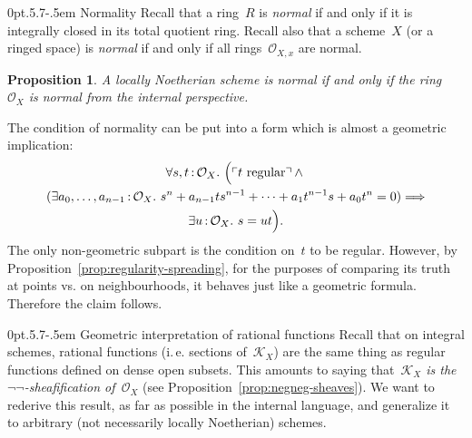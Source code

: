 \documentclass[10pt,reqno,a4paper]{amsbook}
\makeatletter
\theoremstyle{definition}
\theoremstyle{plain}
\newtheorem{prop}[defn]{Proposition}
\theoremstyle{remark}
\renewcommand{\O}{\mathcal{O}}
\newcommand{\K}{\mathcal{K}}
\newcommand{\?}{\,{:}\,}
\renewcommand{\_}{\mathpunct{.}\,}
\newcommand{\speak}[1]{\ulcorner\text{\textnormal{#1}}\urcorner}
\newcommand{\ie}{i.\,e.\@\xspace}
\newcommand{\vs}{vs.\@\xspace}
\renewenvironment{proof}[1][\proofname]{\par
  \pushQED{\qed}%
  \normalfont \topsep6\p@\@plus6\p@\relax
  \trivlist
  \item[\hskip\labelsep
        \itshape
    #1\@addpunct{.}]\ignorespaces
}{%
  \popQED\endtrivlist\@endpefalse
}
\def\subsection{\@startsection{subsection}{2}%
  {0pt}{.5\linespacing\@plus.7\linespacing}{-.5em}%
  {\normalfont\bfseries}}
\makeatother
\begin{document}
\subsection{Normality}\label{sect:normality}
Recall that a ring~$R$ is \emph{normal} if and only if
it is integrally closed in its total quotient ring. Recall also that a
scheme~$X$ (or a ringed space) is \emph{normal} if and only if all
rings~$\O_{X,x}$ are normal.

\begin{prop}\label{prop:normal-int-ext}A locally Noetherian scheme is normal if and only if the
ring~$\O_X$ is normal from the internal perspective.\end{prop}
\begin{proof}The condition of normality can be put into a form which is almost
a geometric implication:
\begin{multline*}
  \forall s,t\?\O_X\_
  \Bigl(\speak{$t$ regular} \wedge {} \\
  (\exists a_0,\ldots,a_{n-1}\?\O_X\_
  s^n + a_{n-1} t s^{n-1} + \cdots + a_1 t^{n-1} s + a_0 t^n = 0)
  \Longrightarrow \\
  \exists u\?\O_X\_ s = ut\Bigr).
\end{multline*}
The only non-geometric subpart is the condition on~$t$ to be regular. However,
by Proposition~\ref{prop:regularity-spreading}, for the purposes of comparing
its truth at points \vs on neighbourhoods, it behaves just like a geometric
formula. Therefore the claim follows.
\end{proof}


\subsection{Geometric interpretation of rational functions} Recall that on
integral schemes, rational functions (\ie sections of~$\K_X$) are the same
thing as regular functions defined on dense open subsets. This amounts to
saying that~\emph{$\K_X$ is the~$\neg\neg$-sheafification of~$\O_X$}
(see Proposition~\ref{prop:negneg-sheaves}). We want to rederive this result,
as far as possible in the internal language, and generalize it to arbitrary
(not necessarily locally Noetherian) schemes.
\end{document}
